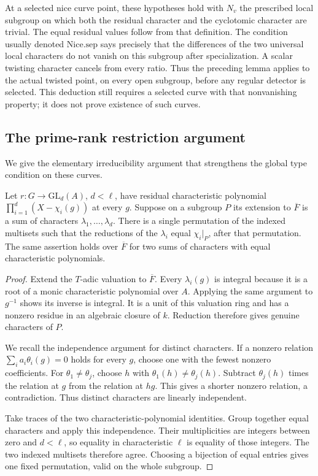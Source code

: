 At a selected nice curve point, these hypotheses hold with
\(N_v\) the prescribed local subgroup on which both the
residual character and the cyclotomic character are trivial.
The equal residual values follow from that definition.
The condition usually denoted \(\mathrm{Nice.sep}\) says precisely
that the differences of the two universal local characters do
not vanish on this subgroup after specialization.
A scalar twisting character cancels from every ratio.
Thus the preceding lemma applies to the actual twisted point,
on every open subgroup, before any regular detector is selected.
This deduction still requires a selected curve with that
nonvanishing property; it does not prove existence of such curves.

\subsection{The prime-rank restriction argument}
We give the elementary irreducibility argument that strengthens
the global type condition on these curves.

\begin{srlemma}
\label{lem:sr-curve-character-matching}
Let \(r:G\to\mathrm{GL}_d(A)\), \(d<\ell\), have residual
characteristic polynomial
\(\prod_{i=1}^d(X-\chi_i(g))\) at every \(g\).
Suppose on a subgroup \(P\) its extension to \(\overline F\)
is a sum of characters \(\lambda_1,\ldots,\lambda_d\).
There is a single permutation of the indexed multisets such that
the reductions of the \(\lambda_i\) equal
\(\chi_i|_P\), after that permutation.
The same assertion holds over \(\overline F\) for two sums of
characters with equal characteristic polynomials.
\end{srlemma}
\begin{proof}
Extend the \(T\)-adic valuation to \(\overline F\).
Every \(\lambda_i(g)\) is integral because it is a root of a
monic characteristic polynomial over \(A\).
Applying the same argument to \(g^{-1}\) shows its inverse is
integral.  It is a unit of this valuation ring and has a
nonzero residue in an algebraic closure of \(k\).
Reduction therefore gives genuine characters of \(P\).

We recall the independence argument for distinct characters.
If a nonzero relation \(\sum_i a_i\theta_i(g)=0\) holds for
every \(g\), choose one with the fewest nonzero coefficients.
For \(\theta_1\ne\theta_j\), choose \(h\) with
\(\theta_1(h)\ne\theta_j(h)\).
Subtract \(\theta_j(h)\) times the relation at \(g\) from the
relation at \(hg\).  This gives a shorter nonzero relation,
a contradiction.  Thus distinct characters are linearly
independent.

Take traces of the two characteristic-polynomial identities.
Group together equal characters and apply this independence.
Their multiplicities are integers between zero and \(d<\ell\),
so equality in characteristic \(\ell\) is equality of those
integers.  The two indexed multisets therefore agree.
Choosing a bijection of equal entries gives one fixed
permutation, valid on the whole subgroup.
\end{proof}

